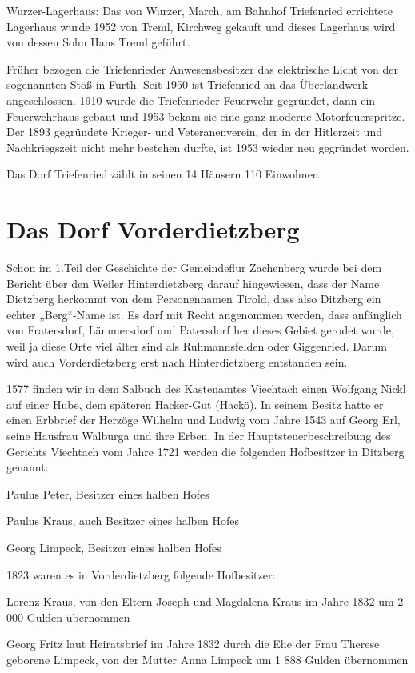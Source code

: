 \documentclass[12pt,a4pager]{book}
\begin{document}
Wurzer-Lagerhaus: Das von Wurzer, March, am Bahnhof Triefenried errichtete
Lagerhaus wurde 1952 von Treml, Kirchweg gekauft und dieses Lagerhaus wird von
dessen Sohn Hans Treml geführt.

Früher bezogen die Triefenrieder Anwesensbesitzer das elektrische Licht von der
sogenannten Stöß in Furth. Seit 1950 ist Triefenried an das Überlandwerk
angeschlossen. 1910 wurde die Triefenrieder Feuerwehr gegründet, dann ein
Feuerwehrhaus gebaut und 1953 bekam sie eine ganz moderne Motorfeuerspritze. Der
1893 gegründete Krieger- und Veteranenverein, der in der Hitlerzeit und
Nachkriegszeit nicht mehr bestehen durfte, ist 1953 wieder neu gegründet worden.

Das Dorf Triefenried zählt in seinen 14 Häusern 110 Einwohner.

\section{Das Dorf Vorderdietzberg}

Schon im 1.Teil der Geschichte der Gemeindeflur Zachenberg wurde bei dem Bericht
über den Weiler Hinterdietzberg darauf hingewiesen, dass der Name Dietzberg
herkommt von dem Personennamen Tirold, dass also Ditzberg ein echter „Berg“-Name
ist. Es darf mit Recht angenommen werden, dass anfänglich von Fratersdorf,
Lämmersdorf und Patersdorf her dieses Gebiet gerodet wurde, weil ja diese Orte
viel älter sind als Ruhmannsfelden oder Giggenried. Darum wird auch
Vorderdietzberg erst nach Hinterdietzberg entstanden sein.

1577 finden wir in dem Salbuch des Kastenamtes Viechtach einen Wolfgang Nickl
auf einer Hube, dem späteren Hacker-Gut (Hackö). In seinem Besitz hatte er einen
Erbbrief der Herzöge Wilhelm und Ludwig vom Jahre 1543 auf Georg Erl, seine
Hausfrau Walburga und ihre Erben. In der Hauptsteuerbeschreibung des Gerichts
Viechtach vom Jahre 1721 werden die folgenden Hofbesitzer in Ditzberg genannt:

Paulus Peter, Besitzer eines halben Hofes

Paulus Kraus, auch Besitzer eines halben Hofes

Georg Limpeck, Besitzer eines halben Hofes

1823 waren es in Vorderdietzberg folgende Hofbesitzer:

Lorenz Kraus, von den Eltern Joseph und Magdalena Kraus im Jahre 1832 um 2 000
Gulden übernommen

Georg Fritz laut Heiratsbrief im Jahre 1832 durch die Ehe der Frau Therese
geborene Limpeck, von der Mutter Anna Limpeck um 1 888 Gulden übernommen
\end{document}
